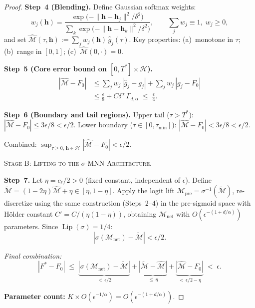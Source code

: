 \documentclass[12pt]{article}
\theoremstyle{remark}
\begin{document}
\begin{proof}
\textbf{Step~4 (Blending).}
Define Gaussian softmax weights:
\[
  w_j(\boldsymbol{h})
  = \frac{\exp\!\bigl(-\|\boldsymbol{h}-\boldsymbol{h}_j\|^2/\delta^2\bigr)}
         {\sum_k \exp\!\bigl(-\|\boldsymbol{h}-\boldsymbol{h}_k\|^2/\delta^2\bigr)},
  \qquad \sum_j w_j \equiv 1,\; w_j \ge 0,
\]
and set
$\hat{\mathcal{M}}(\tau,\boldsymbol{h})
  := \sum_j w_j(\boldsymbol{h})\,\hat{g}_j(\tau)$.
Key properties: (a)~monotone in $\tau$; (b)~range in $[0,1]$; (c)~$\hat{\mathcal{M}}(0,\cdot)=0$.

\textbf{Step~5 (Core error bound on $[0,T^*]\times\mathcal{H}$).}
\begin{align*}
  |\hat{\mathcal{M}} - F_0|
  &\le \sum_j w_j\,|\hat{g}_j - g_j|
       + \sum_j w_j\,|g_j - F_0| \\
  &\le \frac{\epsilon}{8}
       + C\delta^{\alpha}\,\Gamma_{d,\alpha}
  \;\le\; \frac{\epsilon}{4}.
\end{align*}

\textbf{Step~6 (Boundary and tail regions).}
Upper tail ($\tau > T^*$): $|\hat{\mathcal{M}} - F_0| \le 3\epsilon/8 < \epsilon/2$.
Lower boundary ($\tau \in [0,\tau_{\min}]$): $|\hat{\mathcal{M}} - F_0| < 3\epsilon/8 < \epsilon/2$.

Combined:
$\sup_{\tau\ge 0,\,\boldsymbol{h}\in\mathcal{H}}|\hat{\mathcal{M}}-F_0| < \epsilon/2$.

\medskip\noindent\textsc{Stage B: Lifting to the $\sigma$-MNN Architecture.}

\textbf{Step~7.}
Let $\eta = c_\ell/2 > 0$ (fixed constant, independent of $\epsilon$).
Define $\tilde{\mathcal{M}} = (1-2\eta)\hat{\mathcal{M}} + \eta \in [\eta,1-\eta]$.
Apply the logit lift $\mathcal{M}_{\mathrm{pre}} = \sigma^{-1}(\tilde{\mathcal{M}})$,
re-discretize using the same construction (Steps~2--4) in the pre-sigmoid space
with H\"older constant $C' = C/(\eta(1-\eta))$,
obtaining $\mathcal{M}_{\mathrm{net}}$ with $O(\epsilon^{-(1+d/\alpha)})$ parameters.
Since $\operatorname{Lip}(\sigma)=1/4$:
\[
  |\sigma(\mathcal{M}_{\mathrm{net}}) - \tilde{\mathcal{M}}| < \epsilon/2.
\]

\emph{Final combination:}
\[
  |F^* - F_0|
  \;\le\;
  \underbrace{|\sigma(\mathcal{M}_{\mathrm{net}}) - \tilde{\mathcal{M}}|}_{<\,\epsilon/2}
  +
  \underbrace{|\tilde{\mathcal{M}} - \hat{\mathcal{M}}|}_{\le\,\eta}
  +
  \underbrace{|\hat{\mathcal{M}} - F_0|}_{<\,\epsilon/2 - \eta}
  \;<\; \epsilon.
\]

\textbf{Parameter count:}
$K \times O(\epsilon^{-1/\alpha}) = O(\epsilon^{-(1+d/\alpha)})$.
\end{proof}
\end{document}
